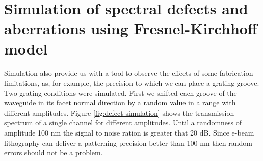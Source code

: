 \documentclass[12pt,twoside,english]{book}
\renewcommand{\~}{\perispomeni}%
\numberwithin{equation}{section}
\numberwithin{figure}{section}
\begin{document}
\section{Simulation of spectral defects and aberrations using Fresnel-Kirchhoff model}
Simulation also provide us with a tool to observe the effects of some fabrication limitations, as, for example, the precision to which we can place a grating groove. Two grating conditions were simulated. First we shifted each groove of the waveguide in its facet normal direction by a random value in a range with different amplitudes. Figure \ref{fig:defect simulation} shows the transmission spectrum of a single channel for different amplitudes. Until a randomness of amplitude 100 nm the signal to noise ration is greater that 20 dB. Since e-beam lithography can deliver a patterning precision better than 100 nm then random errors should not be a problem.
\end{document}
